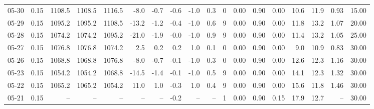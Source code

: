 \begin{threeparttable}
{\begin{tabular}{lrrrrrrrrrrrrrrrrr}
  05-30 &     0.15 & 1108.5 & 1108.5 & 1116.5 &       -8.0 &           -0.7 &                      -0.6 &                     -1.0 &                 0.3 &              0 &       0.00 &      0.90 &           0.00 &             10.6 &                11.9 &            0.93 &                  15.00 \\
  05-29 &     0.15 & 1095.2 & 1095.2 & 1108.5 &      -13.2 &           -1.2 &                      -0.4 &                     -1.0 &                 0.6 &              9 &       0.00 &      0.90 &           0.00 &             11.8 &                13.2 &            1.07 &                  20.00 \\
  05-28 &     0.15 & 1074.2 & 1074.2 & 1095.2 &      -21.0 &           -1.9 &                      -0.0 &                     -1.0 &                 0.9 &              9 &       0.00 &      0.90 &           0.00 &             11.4 &                13.2 &            1.05 &                  25.00 \\
  05-27 &     0.15 & 1076.8 & 1076.8 & 1074.2 &        2.5 &            0.2 &                       0.2 &                      1.0 &                 0.1 &              0 &       0.00 &      0.90 &           0.00 &              9.0 &                10.9 &            0.83 &                  30.00 \\
  05-26 &     0.15 & 1068.8 & 1068.8 & 1076.8 &       -8.0 &           -0.7 &                      -0.1 &                     -1.0 &                 0.3 &              0 &       0.00 &      0.90 &           0.00 &             12.6 &                12.3 &            1.16 &                  30.00 \\
  05-23 &     0.15 & 1054.2 & 1054.2 & 1068.8 &      -14.5 &           -1.4 &                      -0.1 &                     -1.0 &                 0.5 &              9 &       0.00 &      0.90 &           0.00 &             14.1 &                12.3 &            1.32 &                  30.00 \\
  05-22 &     0.15 & 1065.2 & 1065.2 & 1054.2 &       11.0 &            1.0 &                      -0.3 &                      1.0 &                 0.4 &              9 &       0.00 &      0.90 &           0.00 &             15.6 &                11.8 &            1.46 &                  30.00 \\
  05-21 &     0.15 &     -- &     -- &     -- &         -- &             -- &                      -0.2 &                       -- &                  -- &              1 &       0.00 &      0.90 &           0.15 &             17.9 &                12.7 &              -- &                  30.00 \\

\end{tabular}}
\end{threeparttable}
